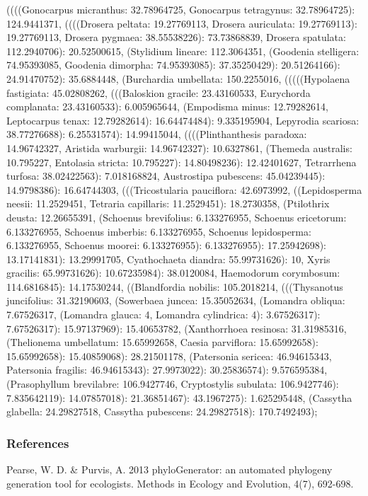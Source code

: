 \footnotesize((((Gonocarpus micranthus: 32.78964725, Gonocarpus tetragynus: 32.78964725): 124.9441371, ((((Drosera peltata: 19.27769113, Drosera auriculata: 19.27769113): 19.27769113, Drosera pygmaea: 38.55538226): 73.73868839, Drosera spatulata: 112.2940706): 20.52500615, (Stylidium lineare: 112.3064351, (Goodenia stelligera: 74.95393085, Goodenia dimorpha: 74.95393085): 37.35250429): 20.51264166): 24.91470752): 35.6884448, (Burchardia umbellata: 150.2255016, (((((Hypolaena fastigiata: 45.02808262, (((Baloskion gracile: 23.43160533, Eurychorda complanata: 23.43160533): 6.005965644, (Empodisma minus: 12.79282614, Leptocarpus tenax: 12.79282614): 16.64474484): 9.335195904, Lepyrodia scariosa: 38.77276688): 6.25531574): 14.99415044, ((((Plinthanthesis paradoxa: 14.96742327, Aristida warburgii: 14.96742327): 10.6327861, (Themeda australis: 10.795227, Entolasia stricta: 10.795227): 14.80498236): 12.42401627, Tetrarrhena turfosa: 38.02422563): 7.018168824, Austrostipa pubescens: 45.04239445): 14.9798386): 16.64744303, (((Tricostularia pauciflora: 42.6973992, ((Lepidosperma neesii: 11.2529451, Tetraria capillaris: 11.2529451): 18.2730358, (Ptilothrix deusta: 12.26655391, (Schoenus brevifolius: 6.133276955, Schoenus ericetorum: 6.133276955, Schoenus imberbis: 6.133276955, Schoenus lepidosperma: 6.133276955, Schoenus moorei: 6.133276955): 6.133276955): 17.25942698): 13.17141831): 13.29991705, Cyathochaeta diandra: 55.99731626): 10, Xyris gracilis: 65.99731626): 10.67235984): 38.0120084, Haemodorum corymbosum: 114.6816845): 14.17530244, ((Blandfordia nobilis: 105.2018214, (((Thysanotus juncifolius: 31.32190603, (Sowerbaea juncea: 15.35052634, (Lomandra obliqua: 7.67526317, (Lomandra glauca: 4, Lomandra cylindrica: 4): 3.67526317): 7.67526317): 15.97137969): 15.40653782, (Xanthorrhoea resinosa: 31.31985316, (Thelionema umbellatum: 15.65992658, Caesia parviflora: 15.65992658): 15.65992658): 15.40859068): 28.21501178, (Patersonia sericea: 46.94615343, Patersonia fragilis: 46.94615343): 27.9973022): 30.25836574): 9.576595384, (Prasophyllum brevilabre: 106.9427746, Cryptostylis subulata: 106.9427746): 7.835642119): 14.07857018): 21.36851467): 43.1967275): 1.625295448, (Cassytha glabella: 24.29827518, Cassytha pubescens: 24.29827518): 170.7492493);


\normalsize
\subsubsection*{References}

Pearse, W. D. \& Purvis, A. 2013 phyloGenerator: an automated phylogeny generation tool for ecologists. Methods in Ecology and Evolution, 4(7), 692-698.

